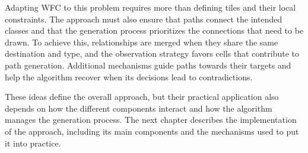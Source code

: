 \documentclass[../../main.tex]{subfiles}
\begin{document}
Adapting WFC to this problem requires more than defining tiles and their local constraints. The approach must also ensure that paths connect the intended classes and that the generation process prioritizes the connections that need to be drawn. To achieve this, relationships are merged when they share the same destination and type, and the observation strategy favors cells that contribute to path generation. Additional mechanisms guide paths towards their targets and help the algorithm recover when its decisions lead to contradictions.

These ideas define the overall approach, but their practical application also depends on how the different components interact and how the algorithm manages the generation process. The next chapter describes the implementation of the approach, including its main components and the mechanisms used to put it into practice.
\end{document}
